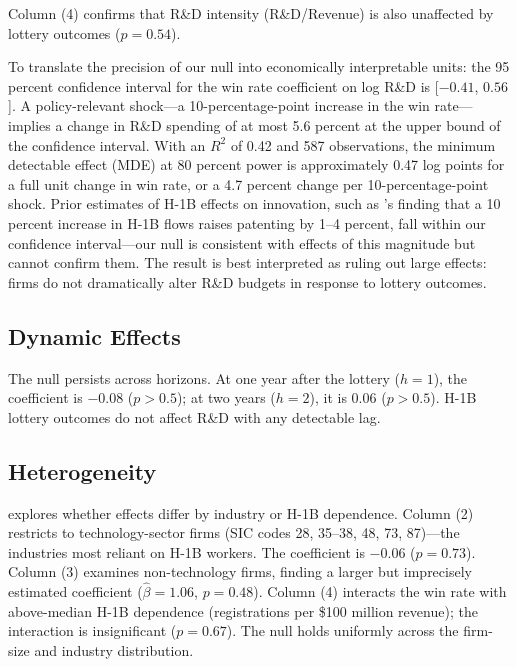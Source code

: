 \documentclass[12pt]{article}
\begin{document}
Column (4) confirms that R\&D intensity (R\&D/Revenue) is also unaffected by lottery outcomes ($p = 0.54$).

To translate the precision of our null into economically interpretable units: the 95 percent confidence interval for the win rate coefficient on log R\&D is [$-0.41$, $0.56$]. A policy-relevant shock---a 10-percentage-point increase in the win rate---implies a change in R\&D spending of at most 5.6 percent at the upper bound of the confidence interval. With an $R^2$ of 0.42 and 587 observations, the minimum detectable effect (MDE) at 80 percent power is approximately 0.47 log points for a full unit change in win rate, or a 4.7 percent change per 10-percentage-point shock. Prior estimates of H-1B effects on innovation, such as \citet{kerr2010}'s finding that a 10 percent increase in H-1B flows raises patenting by 1--4 percent, fall within our confidence interval---our null is consistent with effects of this magnitude but cannot confirm them. The result is best interpreted as ruling out large effects: firms do not dramatically alter R\&D budgets in response to lottery outcomes.

\subsection{Dynamic Effects}

The null persists across horizons. At one year after the lottery ($h = 1$), the coefficient is $-0.08$ ($p > 0.5$); at two years ($h = 2$), it is $0.06$ ($p > 0.5$). H-1B lottery outcomes do not affect R\&D with any detectable lag.

\subsection{Heterogeneity}



 explores whether effects differ by industry or H-1B dependence. Column (2) restricts to technology-sector firms (SIC codes 28, 35--38, 48, 73, 87)---the industries most reliant on H-1B workers. The coefficient is $-0.06$ ($p = 0.73$). Column (3) examines non-technology firms, finding a larger but imprecisely estimated coefficient ($\hat{\beta} = 1.06$, $p = 0.48$). Column (4) interacts the win rate with above-median H-1B dependence (registrations per \$100 million revenue); the interaction is insignificant ($p = 0.67$). The null holds uniformly across the firm-size and industry distribution.
\end{document}
